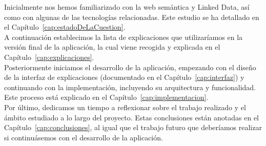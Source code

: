 Inicialmente nos hemos familiarizado con la web semántica y Linked Data, así como con algunas de las tecnologías relacionadas. Este estudio se ha detallado en el Capítulo~\ref{cap:estadoDeLaCuestion}.\\

A continuación establecimos la lista de explicaciones que utilizaríamos en la versión final de la aplicación, la cual viene recogida y explicada en el Capítulo~\ref{cap:explicaciones}.\\

Posteriormente iniciamos el desarrollo de la aplicación, empezando con el diseño de la interfaz de explicaciones (documentado en el Capítulo~\ref{cap:interfaz}) y continuando con la implementación, incluyendo su arquitectura y funcionalidad. Este proceso está explicado en el Capítulo~\ref{cap:implementacion}.\\

Por último, dedicamos un tiempo a reflexionar sobre el trabajo realizado y el ámbito estudiado a lo largo del proyecto. Estas conclusiones están anotadas en el Capítulo~\ref{cap:conclusiones}, al igual que el trabajo futuro que deberíamos realizar si continuásemos con el desarrollo de la aplicación.\\
